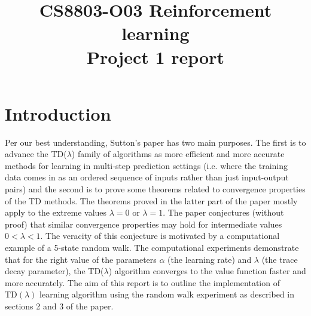 \documentclass[conference]{IEEEtran}
\begin{document}
\title{CS8803-O03 Reinforcement learning\\Project 1 report}

\author{
}
\maketitle


\IEEEpeerreviewmaketitle
\section{Introduction}
Per our best understanding, Sutton's paper \cite{sutton88} has two main purposes. The first is to advance the TD($\lambda$) family of algorithms as more efficient and more accurate methods for learning in multi-step prediction settings (i.e. where the training data comes in as an ordered sequence of inputs rather than just input-output pairs) and the second is to prove some theorems related to convergence properties of the TD methods. The theorems proved in the latter part of the paper mostly apply to the extreme values $\lambda=0$ or $\lambda=1$. The paper conjectures (without proof) that similar convergence properties may hold for intermediate values $0<\lambda<1$. The veracity of this conjecture is motivated by a computational example of a 5-state random walk. The computational experiments demonstrate that for the right value of the parameters $\alpha$ (the learning rate) and $\lambda$ (the trace decay parameter), the TD($\lambda$) algorithm converges to the value function faster and more accurately. The aim of this report is to outline the implementation of $\text{TD}(\lambda)$ learning algorithm using the random walk experiment as described in sections 2 and 3 of the paper. 
\end{document}
